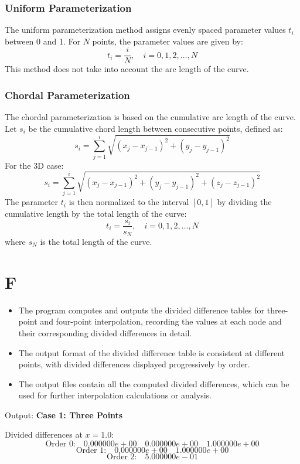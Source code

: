 \documentclass[a4paper]{article}
\begin{document}
\subsubsection{Uniform Parameterization}

The uniform parameterization method assigns evenly spaced parameter values \( t_i \) between 0 and 1. For \( N \) points, the parameter values are given by:
\[
t_i = \frac{i}{N}, \quad i = 0, 1, 2, \dots, N
\]
This method does not take into account the arc length of the curve.

\subsubsection{Chordal Parameterization}

The chordal parameterization is based on the cumulative arc length of the curve. Let \( s_i \) be the cumulative chord length between consecutive points, defined as:
\[
s_i = \sum_{j=1}^{i} \sqrt{(x_j - x_{j-1})^2 + (y_j - y_{j-1})^2}
\]
For the 3D case:
\[
s_i = \sum_{j=1}^{i} \sqrt{(x_j - x_{j-1})^2 + (y_j - y_{j-1})^2 + (z_j - z_{j-1})^2}
\]
The parameter \( t_i \) is then normalized to the interval \( [0, 1] \) by dividing the cumulative length by the total length of the curve:
\[
t_i = \frac{s_i}{s_N}, \quad i = 0, 1, 2, \dots, N
\]
where \( s_N \) is the total length of the curve.

\section*{F}

\begin{itemize}
    \item The program computes and outputs the divided difference tables for three-point and four-point interpolation, recording the values at each node and their corresponding divided differences in detail.
    \item The output format of the divided difference table is consistent at different points, with divided differences displayed progressively by order.
    \item The output files contain all the computed divided differences, which can be used for further interpolation calculations or analysis.
\end{itemize}

Output:
\textbf{Case 1: Three Points}

Divided differences at \( x = 1.0 \):
\[
\text{Order 0:} \quad 0.000000e+00 \quad 0.000000e+00 \quad 1.000000e+00
\]
\[
\text{Order 1:} \quad 0.000000e+00 \quad 1.000000e+00
\]
\[
\text{Order 2:} \quad 5.000000e-01
\]
\end{document}
